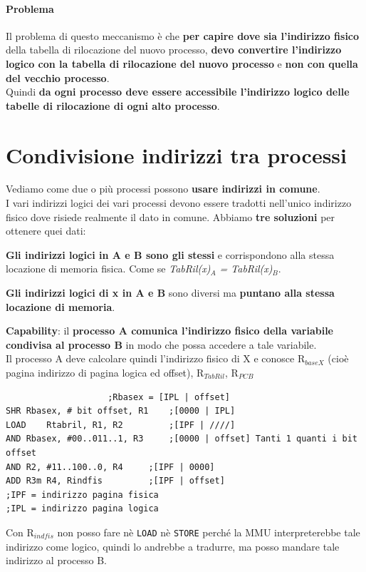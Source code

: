 \documentclass[10pt]{report}
\begin{document}
\paragraph{Problema} Il problema di questo meccanismo è che \textbf{per capire dove sia l'indirizzo fisico} della tabella di rilocazione del nuovo processo, \textbf{devo convertire l'indirizzo logico con la tabella di rilocazione del nuovo processo} e \textbf{non con quella del vecchio processo}.\\
Quindi \textbf{da ogni processo deve essere accessibile l'indirizzo logico delle tabelle di rilocazione di ogni alto processo}.
\section{Condivisione indirizzi tra processi}
Vediamo come due o più processi possono \textbf{usare indirizzi in comune}.\\
I vari indirizzi logici dei vari processi devono essere tradotti nell'unico indirizzo fisico dove risiede realmente il dato in comune. Abbiamo \textbf{tre soluzioni} per ottenere quei dati:
\begin{list}{}{}
	\item \textbf{Gli indirizzi logici in A e B sono gli stessi} e corrispondono alla stessa locazione di memoria fisica. Come se \textit{TabRil(x)$_A$ = TabRil(x)$_B$}.
	\item \textbf{Gli indirizzi logici di x in A e B} sono diversi ma \textbf{puntano alla stessa locazione di memoria}.
	\item \textbf{Capability}: il \textbf{processo A comunica l'indirizzo fisico della variabile condivisa al processo B} in modo che possa accedere a tale variabile.\\
	Il processo A deve calcolare quindi l'indirizzo fisico di X e conosce R$_{baseX}$ (cioè pagina indirizzo di pagina logica ed offset), R$_{TabRil}$, R$_{PCB}$
\end{list}
\begin{lstlisting}
					;Rbasex = [IPL | offset]
SHR	Rbasex, # bit offset, R1	;[0000 | IPL]
LOAD	Rtabril, R1, R2			;[IPF | ////]
AND	Rbasex, #00..011..1, R3		;[0000 | offset] Tanti 1 quanti i bit offset
AND	R2, #11..100..0, R4		;[IPF | 0000]
ADD	R3m R4, Rindfis			;[IPF | offset]
;IPF = indirizzo pagina fisica
;IPL = indirizzo pagina logica
\end{lstlisting}
Con R$_{indfis}$ non posso fare nè \texttt{LOAD} nè \texttt{STORE} perché la MMU interpreterebbe tale indirizzo come logico, quindi lo andrebbe a tradurre, ma posso mandare tale indirizzo al processo B.\\
\end{document}
